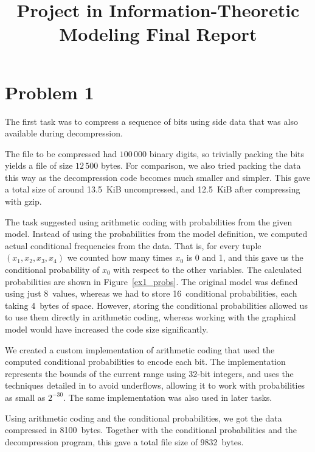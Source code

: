 \documentclass{article}
\title{Project in Information-Theoretic Modeling Final Report}
\begin{document}
\maketitle



\section{Problem 1}

The first task was to compress a sequence of bits using side data that was also available during decompression.

The file to be compressed had $100\,000$ binary digits, so trivially packing the bits yields a file of size $12\,500$ bytes.
For comparison, we also tried packing the data this way as the decompression code becomes much smaller and simpler.
This gave a total size of around 13.5~KiB uncompressed, and 12.5~KiB after compressing with gzip.

The task suggested using arithmetic coding with probabilities from the given model.
Instead of using the probabilities from the model definition, we computed actual conditional frequencies from the data.
That is, for every tuple $(x_1,x_2,x_3,x_4)$ we counted how many times $x_0$ is 0 and 1, and this gave us the conditional probability of $x_0$ with respect to the other variables.
The calculated probabilities are shown in Figure~\ref{ex1_probs}.
The original model was defined using just 8~values, whereas we had to store 16~conditional probabilities, each taking 4~bytes of space.
However, storing the conditional probabilities allowed us to use them directly in arithmetic coding, whereas working with the graphical model would have increased the code size significantly.

We created a custom implementation of arithmetic coding that used the computed conditional probabilities to encode each bit. The implementation represents the bounds of the current range using 32-bit integers, and uses the techniques detailed in \cite{arith} to avoid underflows, allowing it to work with probabilities as small as $2^{-30}$. The same implementation was also used in later tasks.

Using arithmetic coding and the conditional probabilities, we got the data compressed in 8100~bytes.
Together with the conditional probabilities and the decompression program, this gave a total file size of 9832~bytes.
\end{document}
